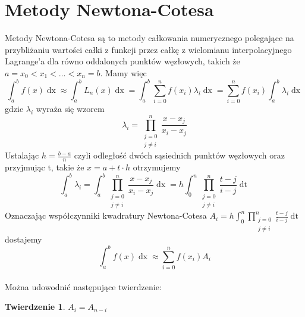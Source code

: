 \documentclass[11pt,wide]{article}
\newtheorem{thm}{Twierdzenie}
\begin{document}
\section{Metody Newtona-Cotesa}
Metody Newtona-Cotesa są to metody całkowania numerycznego polegające na przybliżaniu wartości całki z funkcji przez całkę z wielomianu interpolacyjnego Lagrange'a dla równo oddalonych punktów węzłowych, takich że \(a = x_0 < x_1 < \ldots < x_n  = b\).
Mamy więc
\begin{equation}
\int_a^b f(x)\mathop{dx} \approx \int_a^b L_n(x) \mathop{dx} = \int_a^b \sum_{i=0}^n f(x_i) \lambda_i \mathop{dx} = \sum_{i=0}^n f(x_i) \int_a^b  \lambda_i \mathop{dx}
\end{equation}
gdzie \(\lambda_i \) wyraża się wzorem
\begin{equation}
\lambda_i = \prod_{\substack{j=0 \\ j \neq i}}^n \frac{x-x_j}{x_i-x_j}
\end{equation}
Ustalając \(\displaystyle h =\frac{b - a}{n}\) czyli odległość dwóch sąsiednich punktów węzłowych oraz przyjmując t, takie że \(x = a + t\cdot h\) otrzymujemy
\begin{equation}
\int_a^b \lambda_i = \int_a^b \prod_{\substack{j=0 \\ j \neq i}}^n \frac{x-x_j}{x_i-x_j} \mathop{dx} = h \int_0^n \prod_{\substack{j=0 \\ j \neq i}}^n \frac{t-j}{i-j} \mathop{dt}
\end{equation}
Oznaczając współczynniki kwadratury Newtona-Cotesa \(\displaystyle A_i = h \int_0^n \prod_{\substack{j=0 \\ j \neq i}}^n \frac{t-j}{i-j} \mathop{dt}\) dostajemy
\begin{equation}
\int_a^b f(x)\mathop{dx} \approx \sum_{i=0}^n f(x_i) A_i
\end{equation}
\\
Można udowodnić następujące twierdzenie:
\begin{thm}
\label{tw:WspKwNewCot}
\(A_i = A_{n-i} \)
\end{thm}
\end{document}
